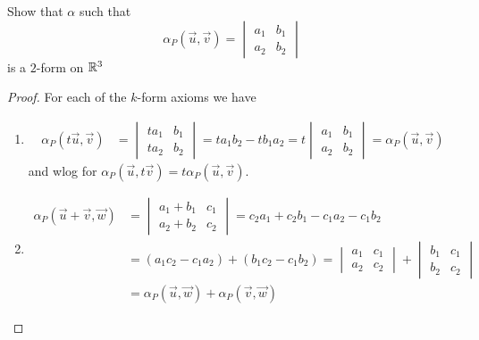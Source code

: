 \documentclass[notes]{subfiles}
\begin{document}
\begin{exercise} \label{basic_2_form_on_r3}
    Show that $\alpha$ such that
    \[
        \alpha_P(\vec{u}, \vec{v}) = \begin{vmatrix}
            a_1 & b_1 \\
            a_2 & b_2
        \end{vmatrix}
    \]
    is a $2$-form on $\mathbb{R}^3$
\end{exercise}
\begin{proof}
    For each of the $k$-form axioms we have
    \begin{enumerate}[label = (\arabic*)]
        \item \begin{align*}
            \alpha_P(t\vec{u}, \vec{v})
            &= \begin{vmatrix}
                ta_1 & b_1 \\
                ta_2 & b_2
            \end{vmatrix}
            = ta_1b_2 - tb_1a_2
            = t\begin{vmatrix}
                a_1 & b_1 \\
                a_2 & b_2
            \end{vmatrix}
            = \alpha_P(\vec{u}, \vec{v})
        \end{align*}
        and wlog for $\alpha_P(\vec{u}, t\vec{v}) = t\alpha_P(\vec{u}, \vec{v})$.
        \item \begin{align*}
            \alpha_P(\vec{u} + \vec{v}, \vec{w})
            &= \begin{vmatrix}
                a_1 + b_1 & c_1 \\
                a_2 + b_2 & c_2
            \end{vmatrix}
            = c_2a_1 + c_2b_1 - c_1a_2 - c_1b_2 \\
            &= (a_1c_2 - c_1a_2) + (b_1c_2 - c_1b_2)
            = \begin{vmatrix}
                a_1 & c_1 \\
                a_2 & c_2
            \end{vmatrix}
            +
            \begin{vmatrix}
                b_1 & c_1 \\
                b_2 & c_2
            \end{vmatrix} \\
            &= \alpha_P(\vec{u}, \vec{w}) + \alpha_P(\vec{v}, \vec{w})

\end{align*}
\end{enumerate}
\end{proof}
\end{document}
